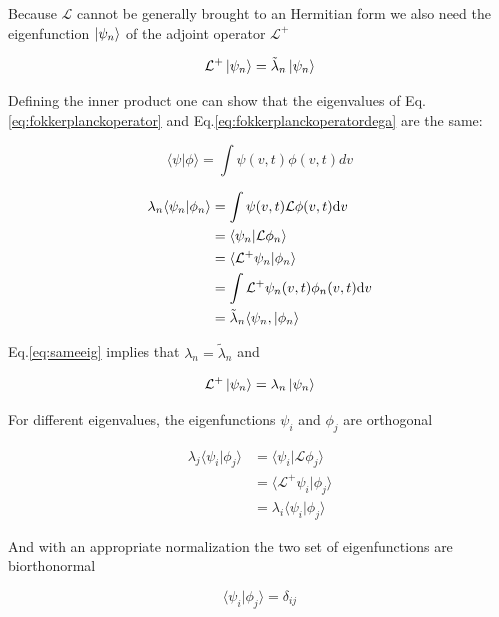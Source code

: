 \documentclass[a4paper,11pt,twoside]{article}
\def \dd  {{\rm d}}
\numberwithin{equation}{section}
\begin{document}
Because $\mathcal{L}$ cannot be generally brought to an Hermitian form we also need  the eigenfunction $\ket{\psi_n}$ of the adjoint operator  $\mathcal{L}^{+}$

\begin{equation}
\label{eq:fokkerplanckoperatordega}
\mathcal{L}^+\ket{\psi_n}=\tilde{\lambda}_n\ket{\psi_n}
\end{equation}

Defining the inner product one can show that the eigenvalues of Eq.\eqref{eq:fokkerplanckoperator} and Eq.\eqref{eq:fokkerplanckoperatordega} are the same:

\begin{equation}
\label{eq:innerproduct}
\langle\psi|\phi\rangle=\int\psi(v,t)\phi(v,t)dv
\end{equation}

\begin{align}
\lambda_n\langle\psi_n|\phi_n\rangle &=\int\psi(v,t)\mathcal{L}\phi(v,t)\dd v  \nonumber \\
&=\langle\psi_n|\mathcal{L}\phi_n\rangle \nonumber \\
&=\langle\mathcal{L}^+\psi_n|\phi_n\rangle  \nonumber \\
&=\int\mathcal{L}^+\psi_n(v,t)\phi_n(v,t)\dd v \nonumber \\
&=\tilde{\lambda}_n\langle\psi_n,|\phi_n\rangle \label{eq:sameeig}
\end{align}

Eq.\eqref{eq:sameeig} implies that $\lambda_n=\tilde{\lambda}_n$ and

\begin{equation}
\label{eq:fokkerplanckoperatordega2}
\mathcal{L}^+\ket{\psi_n}=\lambda_n\ket{\psi_n}
\end{equation}


For different eigenvalues, the eigenfunctions $\psi_i$ and $\phi_j$ are orthogonal

\begin{align}
\lambda_j\langle\psi_i|\phi_j\rangle
&=\langle\psi_i|\mathcal{L}\phi_j\rangle \nonumber \\
&=\langle\mathcal{L}^+\psi_i|\phi_j\rangle  \nonumber \\
&=\lambda_i\langle\psi_i|\phi_j\rangle \label{eq:lorthogonal}
\end{align}

And with an appropriate normalization the two set of eigenfunctions are biorthonormal

\begin{equation}
\label{eq:dij}
\langle\psi_i|\phi_j\rangle=\delta_{ij}
\end{equation}
\end{document}
